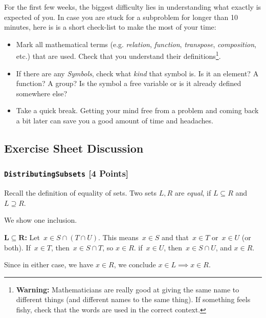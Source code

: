 For the first few weeks, the biggest difficulty lies in understanding what exactly is expected of you.
In case you are stuck for a subproblem for longer than 10 minutes, here is is a short check-list to make the most of your time:
\begin{itemize}
  \item Mark all mathematical terms (e.g. \emph{relation}, \emph{function}, \emph{transpose}, \emph{composition}, etc.) that are used.
    Check that you understand their definitions\footnote{\textbf{Warning:} Mathematicians are really good at giving the same name to different things (and different names to the same thing). If something feels fishy, check that the words are used in the correct context.}.

  \item If there are any \emph{Symbols}, check what \emph{kind} that symbol is. Is it an element? A function? A group?
    Is the symbol a free variable or is it already defined somewhere else? 
  \item Take a quick break. Getting your mind free from a problem and coming back a bit later can save you a good amount of time and headaches.
\end{itemize}

\subsection{Exercise Sheet Discussion}


\subsubsection{\texttt{DistributingSubsets} [4 Points]}

Recall the definition of equality of sets. Two sets $L,R$ are \emph{equal}, if $L \subseteq R$ and $L \supseteq R$.

We show one inclusion.

\textbf{$\bm{L \subseteq R}$:} 
Let~$x \in S \cap (T \cap U)$.
This means~$x \in S$ and that~$x \in T$ or~$x \in U$ (or both).
If~$x \in T$, then~$x \in S \cap T$, so $x \in R$.
if~$x \in U$, then~$x \in S \cap U$, and $x \in R$.

Since in either case, we have $x \in R$, we conclude $x \in L \implies x \in R$.



